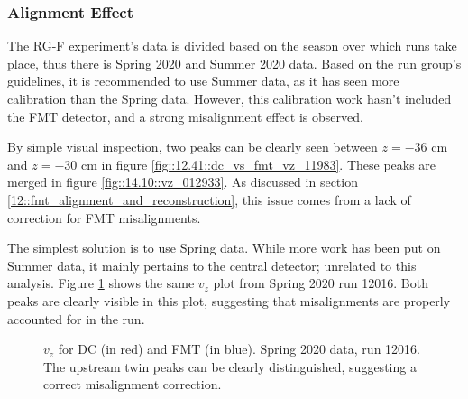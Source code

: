 \subsubsection{Alignment Effect}
\label{14.11::alignment_effect}
    The RG-F experiment's data is divided based on the season over which runs take place, thus there is Spring 2020 and Summer 2020 data.
    Based on the run group's guidelines, it is recommended to use Summer data, as it has seen more calibration than the Spring data.
    However, this calibration work hasn't included the FMT detector, and a strong misalignment effect is observed.

    By simple visual inspection, two peaks can be clearly seen between $z = -36$ cm and $z = -30$ cm in figure \ref{fig::12.41::dc_vs_fmt_vz_11983}.
    These peaks are merged in figure \ref{fig::14.10::vz_012933}.
    As discussed in section \ref{12::fmt_alignment_and_reconstruction}, this issue comes from a lack of correction for FMT misalignments.

    The simplest solution is to use Spring data.
    While more work has been put on Summer data, it mainly pertains to the central detector; unrelated to this analysis.
    Figure \ref{fig::14.11::vz_012016} shows the same $v_z$ plot from Spring 2020 run 12016.
    Both peaks are clearly visible in this plot, suggesting that misalignments are properly accounted for in the run.

    \begin{figure}[t!]
        \centering{}
        \caption[$v_z$ for DC and FMT, run 12016]{$v_z$ for DC (in red) and FMT (in blue). Spring 2020 data, run 12016. The upstream twin peaks can be clearly distinguished, suggesting a correct misalignment correction.}
        \label{fig::14.11::vz_012016}
    \end{figure}
